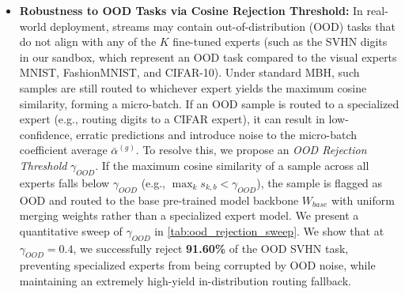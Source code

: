 \begin{itemize}
    \item \textbf{Robustness to OOD Tasks via Cosine Rejection Threshold:} In real-world deployment, streams may contain out-of-distribution (OOD) tasks that do not align with any of the $K$ fine-tuned experts (such as the SVHN digits in our sandbox, which represent an OOD task compared to the visual experts MNIST, FashionMNIST, and CIFAR-10). Under standard MBH, such samples are still routed to whichever expert yields the maximum cosine similarity, forming a micro-batch. If an OOD sample is routed to a specialized expert (e.g., routing digits to a CIFAR expert), it can result in low-confidence, erratic predictions and introduce noise to the micro-batch coefficient average $\bar{\alpha}^{(g)}$. To resolve this, we propose an \emph{OOD Rejection Threshold} $\gamma_{OOD}$. If the maximum cosine similarity of a sample across all experts falls below $\gamma_{OOD}$ (e.g., $\max_k s_{k,b} < \gamma_{OOD}$), the sample is flagged as OOD and routed to the base pre-trained model backbone $W_{base}$ with uniform merging weights rather than a specialized expert model. We present a quantitative sweep of $\gamma_{OOD}$ in \cref{tab:ood_rejection_sweep}. We show that at $\gamma_{OOD}=0.4$, we successfully reject \textbf{91.60\%} of the OOD SVHN task, preventing specialized experts from being corrupted by OOD noise, while maintaining an extremely high-yield in-distribution routing fallback.


\end{itemize}
